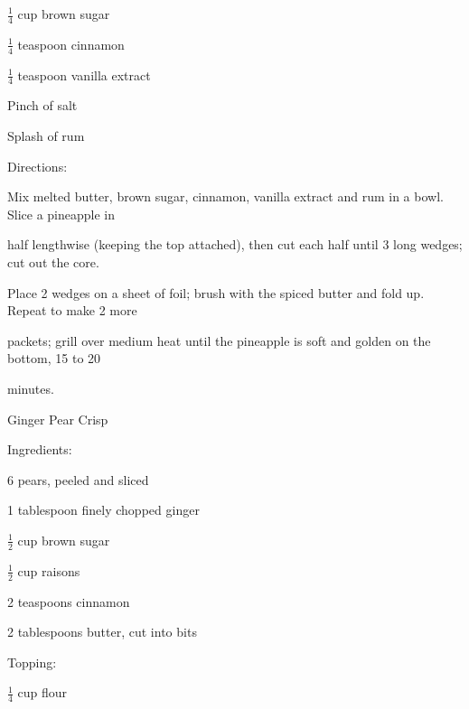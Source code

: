 \documentclass[a4paper,portrait,12pt]{book}
\begin{document}
$\frac{1}{4}$ cup brown sugar




$\frac{1}{4}$ teaspoon cinnamon




$\frac{1}{4}$ teaspoon vanilla extract




Pinch of salt




Splash of rum




Directions:




Mix melted butter, brown sugar, cinnamon, vanilla extract and rum in a bowl. Slice a pineapple in




half lengthwise (keeping the top attached), then cut each half until 3 long wedges; cut out the core.




Place 2 wedges on a sheet of foil; brush with the spiced butter and fold up. Repeat to make 2 more




packets; grill over medium heat until the pineapple is soft and golden on the bottom, 15 to 20




minutes.







\newpage
Ginger Pear Crisp




Ingredients:




6 pears, peeled and sliced




1 tablespoon finely chopped ginger




$\frac{1}{2}$ cup brown sugar




$\frac{1}{2}$ cup raisons




2 teaspoons cinnamon




2 tablespoons butter, cut into bits




Topping:




$\frac{1}{4}$ cup flour
\end{document}

